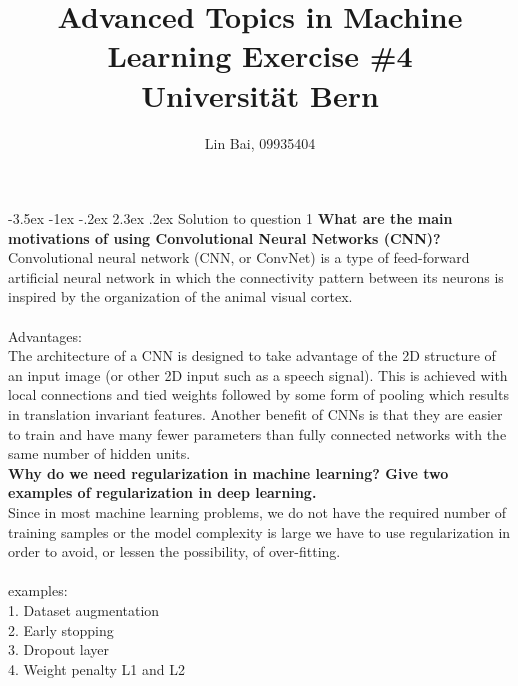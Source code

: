 \documentclass[12pt]{article}
\makeatletter
\renewcommand\section{\@startsection {section}{1}{\z@}%
	{-3.5ex \@plus -1ex \@minus -.2ex}%
	{2.3ex \@plus.2ex}%
	{\normalfont\large\bfseries}}%
\makeatother
\begin{document}
	
	
	
	\title{\textbf{Advanced Topics in Machine Learning Exercise \#{4}}\\
	Universit{\"a}t Bern}%
	\author{{Lin Bai, 09935404}} %
	
	\maketitle

	\section{Solution to question 1}
	\textbf{What are the main motivations of using Convolutional Neural Networks (CNN)?}\\
	Convolutional neural network (CNN, or ConvNet) is a type of feed-forward artificial neural network in which the connectivity pattern between its neurons is inspired by the organization of the animal visual cortex.\\
	\\
	Advantages:\\
	The architecture of a CNN is designed to take advantage of the 2D structure of an input image (or other 2D input such as a speech signal). This is achieved with local connections and tied weights followed by some form of pooling which results in translation invariant features. Another benefit of CNNs is that they are easier to train and have many fewer parameters than fully connected networks with the same number of hidden units.\\

	\noindent
	\textbf{Why do we need regularization in machine learning? Give two examples of regularization in deep learning.}\\
	Since in most machine learning problems, we do not have the required number of training samples or the model complexity is large we have to use regularization in order to avoid, or lessen the possibility, of over-fitting.\\
	\\
	examples:\\
	1. Dataset augmentation\\
	2. Early stopping\\
	3. Dropout layer\\
	4. Weight penalty L1 and L2\\
\end{document}
